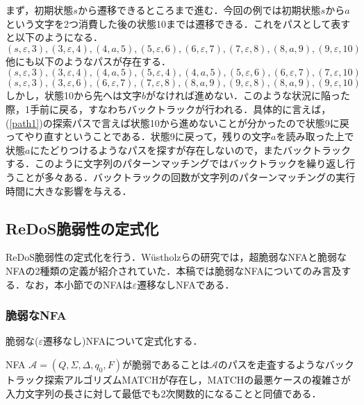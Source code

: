 \documentclass[a4paper, 12pt, dvipdfmx, uplatex]{jsreport}
\begin{document}
まず，初期状態$s$から遷移できるところまで進む．今回の例では初期状態$s$から$a$という文字を2つ消費した後の状態10までは遷移できる．これをパスとして表すと以下のようになる．
\begin{equation}
  (s,\varepsilon,3),(3,\varepsilon,4),(4,a,5),(5,\varepsilon,6),(6,\varepsilon,7),(7,\varepsilon,8),(8,a,9),(9,\varepsilon,10)\label{path1}
\end{equation}
他にも以下のようなパスが存在する．
\begin{equation*}
  (s,\varepsilon,3),(3,\varepsilon,4),(4,a,5),(5,\varepsilon,4),(4,a,5),(5,\varepsilon,6),(6,\varepsilon,7),(7,\varepsilon,10)
\end{equation*}
\begin{equation*}
  (s,\varepsilon,3),(3,\varepsilon,6),(6,\varepsilon,7),(7,\varepsilon,8),(8,a,9),(9,\varepsilon,8),(8,a,9),(9,\varepsilon,10)
\end{equation*}
しかし，状態10から先へは文字$b$がなければ進めない．このような状況に陥った際，1手前に戻る，すなわちバックトラックが行われる．具体的に言えば，(\ref{path1})の探索パスで言えば状態10から進めないことが分かったので状態9に戻ってやり直すということである．状態9に戻って，残りの文字$a$を読み取った上で状態$a$にたどりつけるようなパスを探すが存在しないので，またバックトラックする．このように文字列のパターンマッチングではバックトラックを繰り返し行うことが多々ある．バックトラックの回数が文字列のパターンマッチングの実行時間に大きな影響を与える．


\subsection{ReDoS脆弱性の定式化}
ReDoS脆弱性の定式化を行う．W\"{u}stholzらの研究\cite{vul_detect}では，超脆弱なNFAと脆弱なNFAの2種類の定義が紹介されていた．本稿では脆弱なNFAについてのみ言及する．なお，本小節でのNFAは$\varepsilon$遷移なしNFAである．

\subsubsection{脆弱なNFA}
脆弱な($\varepsilon$遷移なし)NFAについて定式化する．
\begin{dfn}[脆弱なNFA]
  NFA $\mathcal{A}=(Q,\Sigma,\Delta,q_0,F)$が脆弱であることは$\mathcal{A}$のパスを走査するようなバックトラック探索アルゴリズムMATCHが存在し，MATCHの最悪ケースの複雑さが入力文字列の長さに対して最低でも2次関数的になることと同値である．
\end{dfn}
\end{document}
